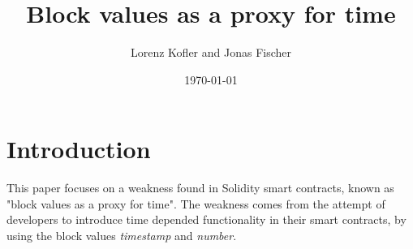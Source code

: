 \documentclass{article}
\title{Block values as a proxy for time}
\author{Lorenz Kofler and Jonas Fischer}
\date{\today}
\begin{document}
\maketitle
\tableofcontents
\newpage

\section{Introduction}
This paper focuses on a weakness found in Solidity smart contracts, known as 
"block values as a proxy for time". The weakness comes from the attempt of
developers to introduce time depended functionality in their smart contracts,
by using the block values \textit{timestamp} and \textit{number}.



\newpage

% 
%
%
%


\newpage

\end{document}
